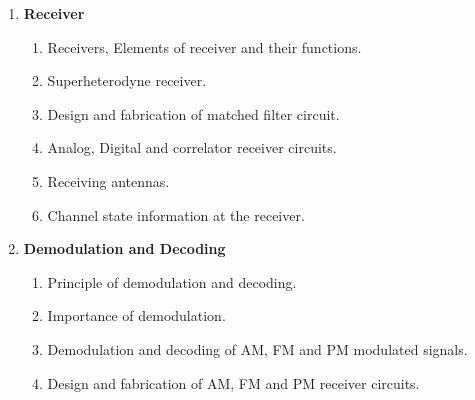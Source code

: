\documentclass[a4paper,12pt]{article}
\begin{document}
\begin{enumerate}[leftmargin=*, align=left]
		\item \textbf{Receiver}
		\begin{enumerate}[label*=\arabic*.]
			\item Receivers, Elements of receiver and their functions.
			\item Superheterodyne receiver.
			\item Design and fabrication of matched filter circuit.
			\item Analog, Digital and correlator receiver circuits.
			\item Receiving antennas.
			\item Channel state information at the receiver.
		\end{enumerate}
		
		\item \textbf{Demodulation and Decoding}
		\begin{enumerate}[label*=\arabic*.]
			\item Principle of demodulation and decoding.
			\item Importance of demodulation.
			\item Demodulation and decoding of AM, FM and PM modulated signals.
			\item Design and fabrication of AM, FM and PM receiver circuits.
		\end{enumerate}
		
	\end{enumerate}
	
\end{document}
